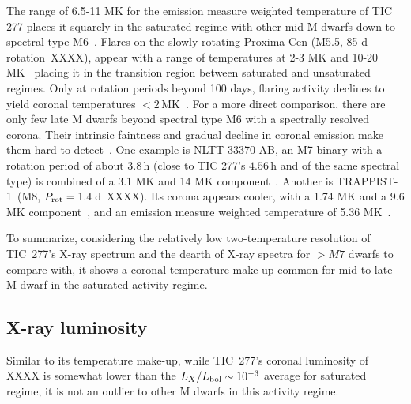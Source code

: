 \documentclass[twocolumn]{aastex631}
\begin{document}
The range of 6.5-11 MK for the emission measure weighted temperature of TIC 277 places it squarely in the saturated regime with other mid M dwarfs down to spectral type M6~\citep{wright2018stellar, magaudda2020relation, stelzer2022first,robrade2005xray,raassen2003xray,paudel2021simultaneous, foster2020corona}. Flares on the slowly rotating Proxima Cen (M5.5, 85 d rotation~XXXX), appear with a range of temperatures at 2-3 MK and 10-20 MK~\citep{gudel2004flares, fuhrmeister2011multiwavelength, fuhrmeister2022high, howard2022mouse} placing it in the transition region between saturated and unsaturated regimes. Only at rotation periods beyond 100 days, flaring activity declines to yield coronal temperatures $<2\,$MK~\citep{wright2018stellar, foster2020corona}. For a more direct comparison, there are only few late M dwarfs beyond spectral type M6 with a spectrally resolved corona. Their intrinsic faintness and gradual decline in coronal emission make them hard to detect~\citep{berger2010, cook2014trends, stelzer2022first}. One example is NLTT 33370 AB, an M7 binary with a rotation period of about $3.8\,$h (close to TIC 277's $4.56\,$h and of the same spectral type) is combined of a 3.1 MK and 14 MK component~\citep{williams2015simultaneous}. Another is TRAPPIST-1~(M8, $P_{\rm rot} = 1.4\,$d~XXXX). Its corona appears cooler, with a 1.74 MK and a 9.6 MK component~\citep{wheatley2017strong}, and an emission measure weighted temperature of 5.36 MK~\citep{brown2023coronal}. 

To summarize, considering the relatively low two-temperature resolution of TIC~277's X-ray spectrum and the dearth of X-ray spectra for $>M7$ dwarfs to compare with, it shows a coronal temperature make-up common for mid-to-late M dwarf in the saturated activity regime. 






\subsection{X-ray luminosity}
\label{sec:discussion:xraylum}
Similar to its temperature make-up, while TIC~277's coronal luminosity of XXXX is somewhat lower than the $L_X/L_{\rm bol}\sim 10^{-3}$ average for saturated regime, it is not an outlier to other M dwarfs in this activity regime.  
\end{document}
